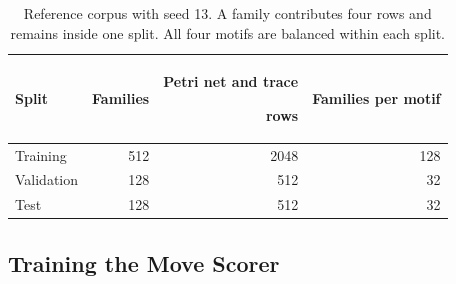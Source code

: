 \begin{table}[!t]
\caption{Reference corpus with seed 13. A family contributes four rows and remains inside one split. All four motifs are balanced within each split.}
\label{tab:splits}
\centering
\begin{tabular}{@{}lrrr@{}}
\toprule
Split & Families & \begin{revised}Petri net and trace\end{revised} rows & Families per motif\\
\midrule
Training & 512 & 2048 & 128\\
Validation & 128 & 512 & 32\\
Test & 128 & 512 & 32\\
\bottomrule
\end{tabular}
\end{table}

\subsection{Training the Move Scorer}
\label{sec:loss}

